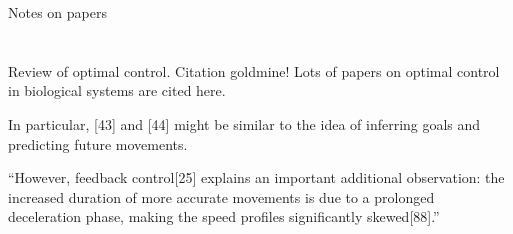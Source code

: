 \documentclass{report}
\begin{document}
\begin{chapter}{Notes on papers}
\section{\cite{Todorov_Optimality_2004}}
Review of optimal control. Citation goldmine! Lots of papers on optimal control
in biological systems are cited here.

In particular, [43] and [44] might be similar to the idea of inferring goals and
predicting future movements.

``However, feedback control[25] explains an important additional observation:
the increased duration of more accurate movements is due to a prolonged
deceleration phase, making the speed profiles significantly skewed[88].''

\end{chapter}

\end{document}
